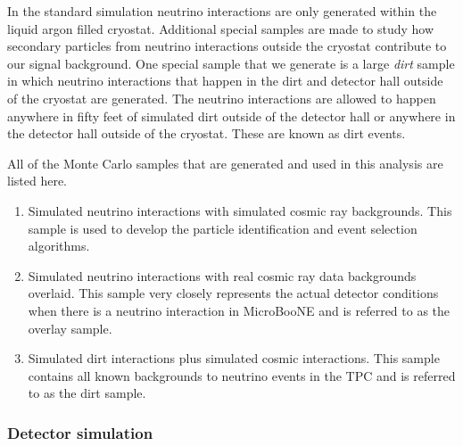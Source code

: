     In the standard simulation neutrino interactions are only generated within
    the liquid argon filled cryostat. Additional special samples are made to
    study how secondary particles from neutrino interactions outside the
    cryostat contribute to our signal background. One special sample that we
    generate is a large \textit{dirt} sample in which neutrino interactions
    that happen in the dirt and detector hall outside of the cryostat are
    generated.  The neutrino interactions are allowed to happen anywhere in
    fifty feet of simulated dirt outside of the detector hall or anywhere in
    the detector hall outside of the cryostat. These are known as dirt events.

    All of the Monte Carlo samples that are generated and used in this analysis
    are listed here.
    \begin{enumerate}
      \item Simulated neutrino interactions with simulated cosmic ray
      backgrounds. This sample is used to develop the particle identification
      and event selection algorithms.
      \item Simulated neutrino interactions with real cosmic ray data backgrounds overlaid.
      This sample very closely represents the actual detector conditions when
      there is a neutrino interaction in MicroBooNE and is referred to as the
      overlay sample.
      \item Simulated dirt interactions plus simulated cosmic interactions.
      This sample contains all known backgrounds to neutrino events in the TPC
      and is referred to as the dirt sample.
    \end{enumerate}

  \subsubsection{Detector simulation}\label{sec:detsim}

